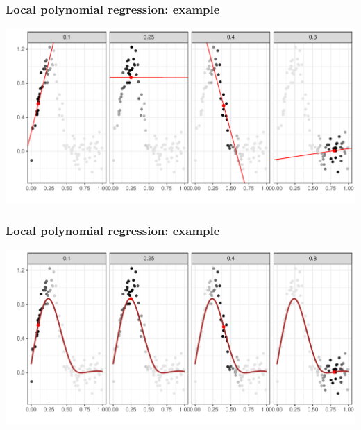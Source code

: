 \documentclass[pdf]{beamer}\usepackage[]{graphicx}\usepackage[]{color}
\makeatletter
\def\maxwidth{ %
  \ifdim\Gin@nat@width>\linewidth
    \linewidth
  \else
    \Gin@nat@width
  \fi
}
\newenvironment{knitrout}{}{} %
\makeatother
\begin{document}
\begin{frame}
\frametitle{Local polynomial regression: example}





\begin{knitrout}
\color{fgcolor}

{\centering \includegraphics[width=\maxwidth]{figure/LoessExplanation_1-1} 

}



\end{knitrout}



\end{frame}

\begin{frame}
\frametitle{Local polynomial regression: example}
\begin{knitrout}
\color{fgcolor}

{\centering \includegraphics[width=\maxwidth]{figure/LoessExplanation_2-1} 

}



\end{knitrout}
\end{frame}
\end{document}
